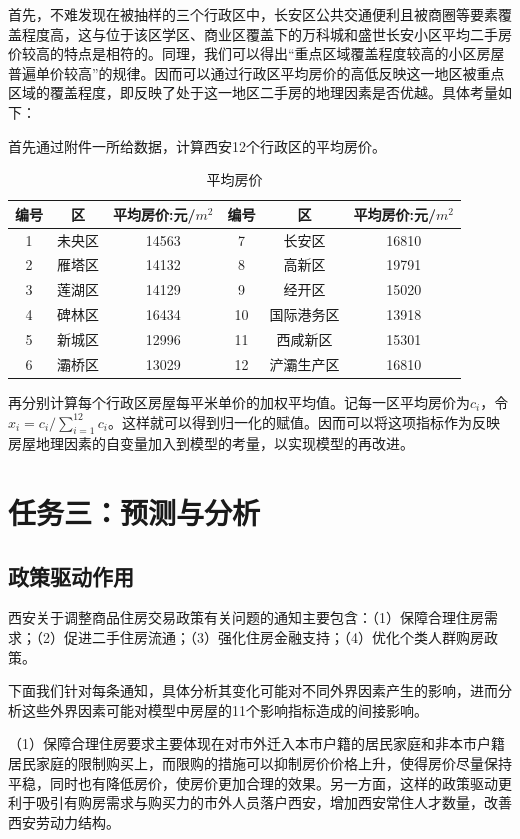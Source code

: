 \documentclass[withoutpreface,bwprint]{cumcmthesis} %
\begin{document}
首先，不难发现在被抽样的三个行政区中，长安区公共交通便利且被商圈等要素覆盖程度高，这与位于该区学区、商业区覆盖下的万科城和盛世长安小区平均二手房价较高的特点是相符的。同理，我们可以得出“重点区域覆盖程度较高的小区房屋普遍单价较高”的规律。因而可以通过行政区平均房价的高低反映这一地区被重点区域的覆盖程度，即反映了处于这一地区二手房的地理因素是否优越。具体考量如下：

首先通过附件一所给数据，计算西安12个行政区的平均房价。
\begin{table}[H]
    \centering
    \caption{平均房价}
    \begin{tabular}{cccccc}
    \toprule
    编号&区 & 平均房价:元/$m^2$&编号&区&平均房价:元/$m^2$\\
    \midrule
        1&未央区 & 14563 &7&长安区 & 16810 \\
        2&雁塔区 & 14132 &8&高新区 & 19791 \\
        3&莲湖区 & 14129 &9&经开区 & 15020 \\
        4&碑林区 & 16434 &10&国际港务区 & 13918 \\
        5&新城区 & 12996 &11&西咸新区  & 15301 \\
        6&灞桥区 & 13029 &12&浐灞生产区 & 16810 \\
    \bottomrule
    \end{tabular}
    
\end{table}

再分别计算每个行政区房屋每平米单价的加权平均值。记每一区平均房价为$c_i$，令$x_i=c_i/\sum_{i=1}^{12}c_i$。这样就可以得到归一化的赋值。因而可以将这项指标作为反映房屋地理因素的自变量加入到模型的考量，以实现模型的再改进。

\section{任务三：预测与分析}
\subsection{政策驱动作用}
西安关于调整商品住房交易政策有关问题的通知主要包含：（1）保障合理住房需求；（2）促进二手住房流通；（3）强化住房金融支持；（4）优化个类人群购房政策。

下面我们针对每条通知，具体分析其变化可能对不同外界因素产生的影响，进而分析这些外界因素可能对模型中房屋的11个影响指标造成的间接影响。

（1）保障合理住房要求主要体现在对市外迁入本市户籍的居民家庭和非本市户籍居民家庭的限制购买上，而限购的措施可以抑制房价价格上升，使得房价尽量保持平稳，同时也有降低房价，使房价更加合理的效果\cite{RN3}。另一方面，这样的政策驱动更利于吸引有购房需求与购买力的市外人员落户西安，增加西安常住人才数量，改善西安劳动力结构。
\end{document}
